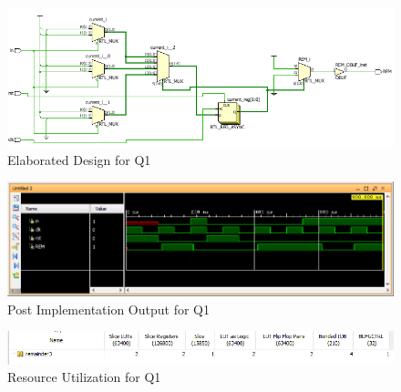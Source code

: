 \documentclass[11pt,a4paper]{article}
\begin{document}
	\begin{figure}[H]
		\centering
		\includegraphics[width=1\linewidth]{images/q1elaborated}
		\caption[]{Elaborated Design for Q1}
		\label{fig:q1elaborated}
	\end{figure}
	
	
	\begin{figure}[H]
		\centering
		\includegraphics[width=1\linewidth]{images/q1output}
		\caption[]{Post Implementation Output for Q1}
		\label{fig:q1output}
	\end{figure}
	\begin{figure}[H]
		\centering
		\includegraphics[width=1\linewidth]{images/q1utilization}
		\caption[]{Resource Utilization for Q1}
		\label{fig:q1utilization}
	\end{figure}
	 
	 
\end{document}
